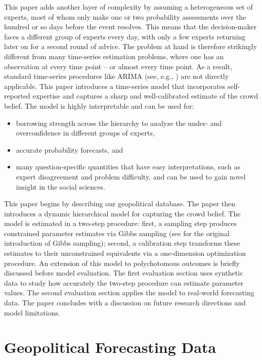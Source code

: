 \documentclass[aoas, preprint]{imsart}
\numberwithin{equation}{section}
\theoremstyle{plain}
\begin{document}
This paper adds another layer of complexity by assuming a heterogeneous set of experts, most of whom only make one or two probability assessments over the hundred or so days before the event resolves. This means that the decision-maker faces a different group of experts  every day, with only a few experts returning later on for a second round of advice. The problem at hand is therefore strikingly different from many time-series estimation problems, where one has an observation at every time point -- or almost every time point. As a result, standard time-series procedures like ARIMA (see, e.g., \citet{mills1991time}) are not directly applicable. This paper introduces a time-series model that incorporates self-reported expertise and captures a sharp and well-calibrated estimate of the crowd belief. The model is highly interpretable and can be used for:
\begin{itemize}
\item borrowing strength across the hierarchy to analyze the under- and overconfidence in different groups of experts,
\item accurate probability forecasts, and
\item many question-specific quantities that have easy interpretations, such as expert disagreement and problem difficulty, and can be used to gain novel insight in the social sciences. 
\end{itemize}

This paper begins by describing our geopolitical database. The paper then introduces a dynamic hierarchical model for capturing the crowd belief. The model is estimated in a two-step procedure: first, a sampling step produces constrained parameter estimates via Gibbs sampling (see \citet{geman1984stochastic} for the original introduction of Gibbs sampling); second, a calibration step transforms these estimates to their unconstrained equivalents via a one-dimension optimization procedure. An extension of this model to polychotomous outcomes is briefly discussed before model evaluation. The first evaluation section uses synthetic data to study how accurately the two-step procedure can estimate parameter values. The second evaluation section applies the model to real-world forecasting data. The paper concludes with a discussion on future research directions and model limitations.

\section{Geopolitical Forecasting Data}
\label{data}
\end{document}
